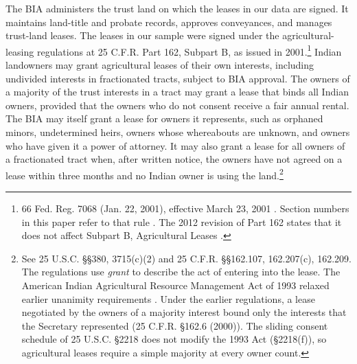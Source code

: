 \documentclass[12pt]{article}
\begin{document}
The BIA administers the trust land on which the leases in our data are signed. It maintains land-title and probate records, approves conveyances, and manages trust-land leases. The leases in our sample were signed under the agricultural-leasing regulations at 25 C.F.R. Part 162, Subpart B, as issued in 2001.\footnote{66 Fed. Reg. 7068 (Jan. 22, 2001), effective March 23, 2001 \citep{DOI2001LeasingRule}. Section numbers in this paper refer to that rule \citep{CFR2008Part162}. The 2012 revision of Part 162 states that it does not affect Subpart B, Agricultural Leases \citep[p.~72440]{BIA2012}.} Indian landowners may grant agricultural leases of their own interests, including undivided interests in fractionated tracts, subject to BIA approval. The owners of a majority of the trust interests in a tract may grant a lease that binds all Indian owners, provided that the owners who do not consent receive a fair annual rental. The BIA may itself grant a lease for owners it represents, such as orphaned minors, undetermined heirs, owners whose whereabouts are unknown, and owners who have given it a power of attorney. It may also grant a lease for all owners of a fractionated tract when, after written notice, the owners have not agreed on a lease within three months and no Indian owner is using the land.\footnote{See 25 U.S.C. \S\S 380, 3715(c)(2) and 25 C.F.R. \S\S 162.107, 162.207(c), 162.209. The regulations use \emph{grant} to describe the act of entering into the lease. The American Indian Agricultural Resource Management Act of 1993 relaxed earlier unanimity requirements \citep{AmericanIndianAgriculturalResourceManagementAct1993}. Under the earlier regulations, a lease negotiated by the owners of a majority interest bound only the interests that the Secretary represented (25 C.F.R. \S 162.6 (2000)). The sliding consent schedule of 25 U.S.C. \S 2218 does not modify the 1993 Act (\S 2218(f)), so agricultural leases require a simple majority at every owner count.}
\end{document}
